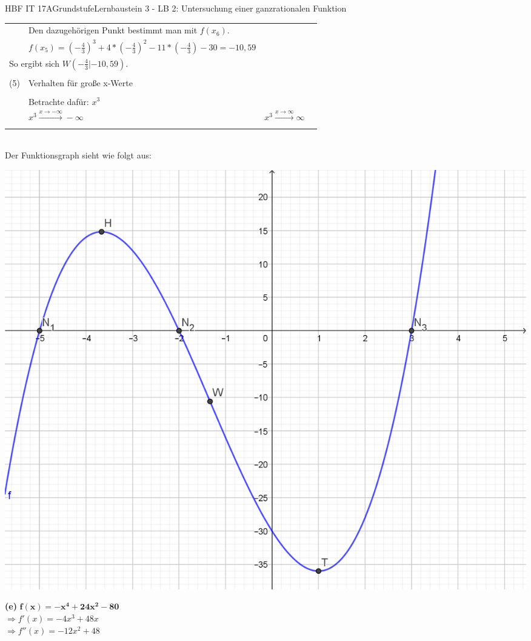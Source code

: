 \documentclass[oneside,openany,headings=optiontotoc,11pt,numbers=noenddot]{scrreprt}
\begin{document}
\begin{worksheet}{HBF IT 17A}{Grundstufe}{Lernbaustein 3 - LB 2: Untersuchung einer ganzrationalen Funktion}
\begin{framed}
\begin{tabularx}{\textwidth}{lXXl}
				& Den dazugehörigen Punkt bestimmt man mit \(f(x_6)\).\\
				& \(f(x_5) = (-\frac{4}{3})^3 +4*(-\frac{4}{3})^2-11*(-\frac{4}{3})-30 = -10,59\)\\
				\multicolumn{2}{l}{So ergibt sich \colorbox{blue!5}{\(W(-\frac{4}{3}|-10,59)\)}.}\\
				\hline\hline\\
				(5) & Verhalten für große x-Werte\\
				\hline\\
				& Betrachte dafür: \(x^3\)\\
				& \colorbox{green!10}{\(x^3\xrightarrow{x\rightarrow-\infty}-\infty\)} & \colorbox{green!10}{\(x^3\xrightarrow{x\rightarrow\infty}\infty\)}\\
				\hline\hline\\
			\end{tabularx}\\
			\newpage
			Der Funktionsgraph sieht wie folgt aus:\\
			\par
			\includegraphics[scale=0.4]{Bilder/HAd.png}\\
		\end{framed}
		\newpage
		\begin{framed}
			\noindent
			\textbf{(e)} \(\mathbf{f(x) = -x^4 +24x^2-80}\)\\
			\(\Rightarrow f'(x) = -4x^3+48x\)\\
			\(\Rightarrow f''(x) = -12x^2+48\)\\
			\par\noindent

\end{framed}
\end{worksheet}
\end{document}
